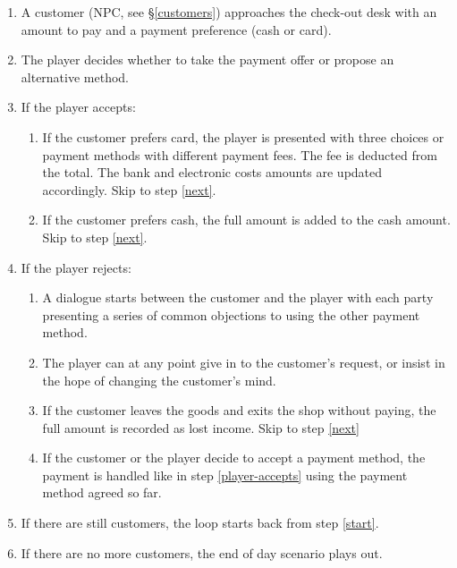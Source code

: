 \documentclass[a4paper,11pt]{article}
\begin{document}
\begin{enumerate}[label={\arabic{enumi}}]
\item \label{start} A customer (NPC, see \S\ref{customers}) approaches the check-out desk with an amount to pay and a payment preference (cash or card).
\item The player decides whether to take the payment offer or propose an alternative method.
\item \label{player-accepts} If the player accepts:

  \begin{enumerate}[label={\arabic{enumi}.\arabic{enumii}}]
  \item If the customer prefers card, the player is presented with three choices or payment methods with different payment fees. The fee is deducted from the total. The bank and electronic costs amounts are updated accordingly. Skip to step \ref{next}.
  \item If the customer prefers cash, the full amount is added to the cash amount. Skip to step \ref{next}.
  \end{enumerate}
\item If the player rejects:

  \begin{enumerate}[label={\arabic{enumi}.\arabic{enumii}}]
  \item A dialogue starts between the customer and the player with each party presenting a series of common objections to using the other payment method.
  \item The player can at any point give in to the customer's request, or insist in the hope of changing the customer's mind.
  \item If the customer leaves the goods and exits the shop without paying, the full amount is recorded as lost income. Skip to step \ref{next}
  \item If the customer or the player decide to accept a payment method, the payment is handled like in step \ref{player-accepts} using the payment method agreed so far.
  \end{enumerate}
\item \label{next} If there are still customers, the loop starts back from step \ref{start}.
\item If there are no more customers, the end of day scenario plays out.


\end{enumerate}
\end{document}
